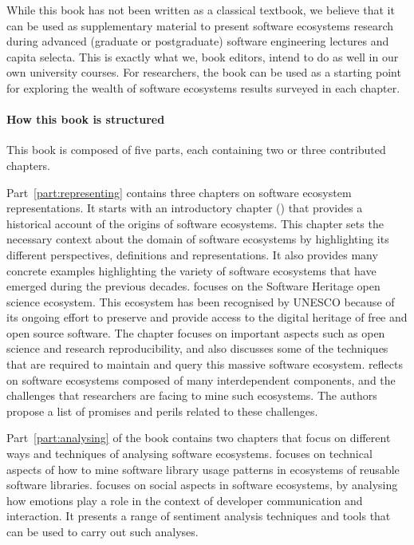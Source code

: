 While this book has not been written as a classical textbook, we believe that it can be used as supplementary material to present software ecosystems research during advanced (graduate or postgraduate) software engineering lectures and capita selecta. This is exactly what we, book editors, intend to do as well in our own university courses.
For researchers, the book can be used as a starting point for exploring the wealth of software ecosystems results surveyed in each chapter.

\paragraph{\textbf{How this book is structured}}

This book is composed of five parts, each containing two or three contributed chapters.

Part~\ref{part:representing} contains three chapters on software ecosystem representations. It starts with an introductory chapter () that provides a historical account of the origins of software ecosystems. This chapter sets the necessary context about the domain of software ecosystems by highlighting its different perspectives, definitions and representations. It also provides many concrete examples highlighting the variety of software ecosystems that have emerged during the previous decades.
 focuses on the Software Heritage open science ecosystem. This ecosystem has been recognised by UNESCO because of its ongoing effort to preserve and provide access to the digital heritage of free and open source software. The chapter focuses on important aspects such as open science and research reproducibility, and also discusses some of the techniques that are required to maintain and query this massive software ecosystem.
 reflects on software ecosystems composed of many interdependent components, and the challenges that researchers are facing to mine such ecosystems. The authors propose a list of promises and perils related to these challenges.

Part~\ref{part:analysing} of the book contains two chapters that focus on different ways and techniques of analysing software ecosystems.
 focuses on technical aspects of how to mine software library usage patterns in ecosystems of reusable software libraries.
 focuses on social aspects in software ecosystems, by analysing how emotions play a role in the context of developer communication and interaction. It presents a range of sentiment analysis techniques and tools that can be used to carry out such analyses.


